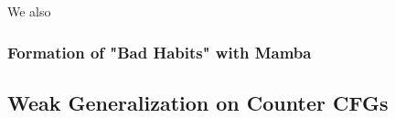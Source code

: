 We also 

\subsubsection{Formation of "Bad Habits" with Mamba}



\subsection{Weak Generalization on Counter CFGs}
